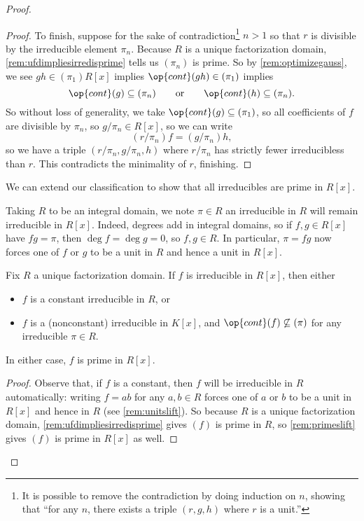 \begin{proof}
\begin{proof}
		To finish, suppose for the sake of contradiction\footnote{It is possible to remove the contradiction by doing induction on $n$, showing that ``for any $n$, there exists a triple $(r,g,h)$ where $r$ is a unit.''} $n>1$ so that $r$ is divisible by the irreducible element $\pi_n$. Because $R$ is a unique factorization domain, \autoref{rem:ufdimpliesirredisprime} tells us $(\pi_n)$ is prime. So by \autoref{rem:optimizegauss}, we see $gh\in(\pi_1)R[x]$ implies $\op{cont}(gh)\in(\pi_1)$ implies
		\[\op{cont}(g)\subseteq(\pi_n)\qquad\text{or}\qquad\op{cont}(h)\subseteq(\pi_n).\]
		So without loss of generality, we take $\op{cont}(g)\subseteq(\pi_1)$, so all coefficients of $f$ are divisible by $\pi_n$, so $g/\pi_n\in R[x]$, so we can write
		\[(r/\pi_n)f=(g/\pi_n)h,\]
		so we have a triple $(r/\pi_n,g/\pi_n,h)$ where $r/\pi_n$ has strictly fewer irreducibless than $r$. This contradicts the minimality of $r$, finishing.
	\end{proof}
	We can extend our classification to show that all irreducibles are prime in $R[x]$.
	\begin{remark}[Nir] \label{rem:irredslift}
		Taking $R$ to be an integral domain, we note $\pi\in R$ an irreducible in $R$ will remain irreducible in $R[x]$. Indeed, degrees add in integral domains, so if $f,g\in R[x]$ have $fg=\pi$, then $\deg f=\deg g=0$, so $f,g\in R$. In particular, $\pi=fg$ now forces one of $f$ or $g$ to be a unit in $R$ and hence a unit in $R[x]$.
	\end{remark}
	\begin{lemma} \label{lem:classifyirreds}
		Fix $R$ a unique factorization domain. If $f$ is irreducible in $R[x]$, then either
		\begin{itemize}
			\item $f$ is a constant irreducible in $R$, or
			\item $f$ is a (nonconstant) irreducible in $K[x]$, and $\op{cont}(f)\not\subseteq(\pi)$ for any irreducible $\pi\in R$.
		\end{itemize}
		In either case, $f$ is prime in $R[x]$.
	\end{lemma}
	\begin{proof}
		Observe that, if $f$ is a constant, then $f$ will be irreducible in $R$ automatically: writing $f=ab$ for any $a,b\in R$ forces one of $a$ or $b$ to be a unit in $R[x]$ and hence in $R$ (see \autoref{rem:unitslift}). So because $R$ is a unique factorization domain, \autoref{rem:ufdimpliesirredisprime} gives $(f)$ is prime in $R$, so \autoref{rem:primeslift} gives $(f)$ is prime in $R[x]$ as well.


\end{proof}
\end{proof}
